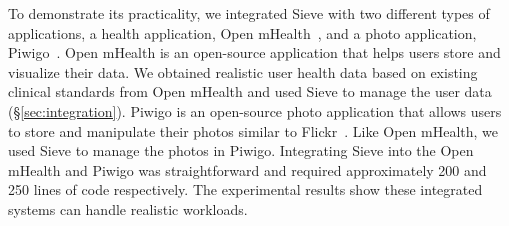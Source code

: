 To demonstrate its practicality, we integrated Sieve with
two different types of applications, a health application, 
Open mHealth~\cite{omh}, and a photo application, Piwigo~\cite{piwigo}.
Open mHealth is an open-source application that 
helps users store and visualize their data. We obtained
realistic user health data based on existing clinical standards
from Open mHealth and used Sieve 
to manage the user data (\S\ref{sec:integration}). Piwigo
is an open-source photo application that allows users to store
and manipulate their photos similar to Flickr~\cite{flickr}. 
Like Open mHealth, we used Sieve to manage the photos in Piwigo.
Integrating Sieve into the Open mHealth and Piwigo 
was straightforward and required approximately 200 and 250 lines of code
respectively. The experimental results show these integrated systems
can handle realistic workloads.